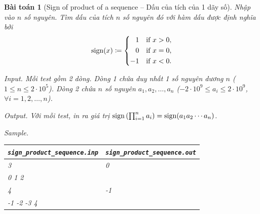 \documentclass{article}
\newtheorem{baitoan}{Bài toán}
\begin{document}
\begin{baitoan}[Sign of product of a sequence -- Dấu của tích của 1 dãy số]
    Nhập vào $n$ số nguyên. Tìm dấu của tích $n$ số nguyên đó với hàm dấu được định nghĩa bởi
    \begin{equation*}
    	{\rm sign}(x)\coloneqq\left\{\begin{split}
    		&1&&\mbox{if } x > 0,\\
    		&0&&\mbox{if } x = 0,\\
    		-&1&&\mbox{if } x < 0.
    	\end{split}\right.
    \end{equation*}
    \item {\sf Input.} Mỗi test gồm 2 dòng. Dòng 1 chứa duy nhất 1 số nguyên dương $n$ ($1\le n\le2\cdot10^5$). Dòng 2 chứa $n$ số nguyên $a_1,a_2,\ldots,a_n$ ($-2\cdot10^9\le a_i\le2\cdot10^9$, $\forall i = 1,2,\ldots,n$).
    \item {\sf Output.} Với mỗi test, in ra giá trị ${\rm sign}\left(\prod_{i=1}^n a_i\right) = {\rm sign}(a_1a_2\cdots a_n)$.
    \item {\sf Sample.}
    \begin{table}[H]
        \centering
        \begin{tabular}{|l|l|}
            \hline
            \verb|sign_product_sequence.inp| & \verb|sign_product_sequence.out| \\
            \hline
            3 & 0 \\
            0 1 2 & \\
            \hline
            4 & -1 \\
            -1 -2 -3 4 & \\
            \hline
        \end{tabular}
    \end{table}
\end{baitoan}
\end{document}
